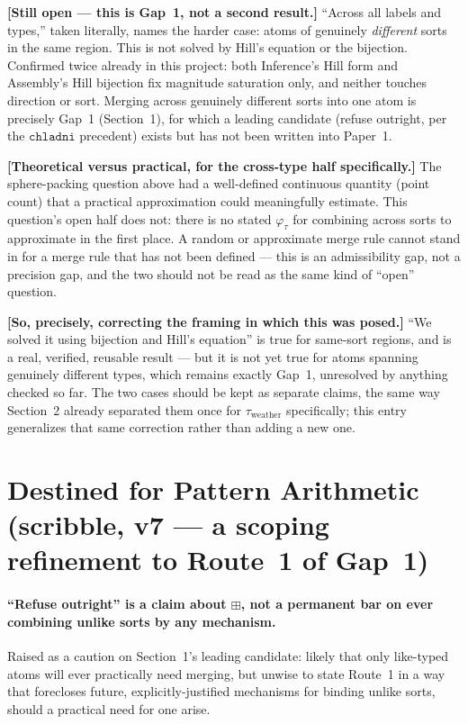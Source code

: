 \documentclass[11pt]{article}
\begin{document}
\textbf{[Still open --- this is Gap~1, not a second result.]} ``Across
all labels and types,'' taken literally, names the harder case: atoms
of genuinely \emph{different} sorts in the same region. This is not
solved by Hill's equation or the bijection. Confirmed twice already
in this project: both Inference's Hill form and Assembly's Hill
bijection fix magnitude saturation only, and neither touches direction
or sort. Merging across genuinely different sorts into one atom is
precisely Gap~1 (Section~1), for which a leading candidate (refuse
outright, per the $\mathtt{chladni}$ precedent) exists but has not
been written into Paper~1.

\textbf{[Theoretical versus practical, for the cross-type half
specifically.]} The sphere-packing question above had a well-defined
continuous quantity (point count) that a practical approximation could
meaningfully estimate. This question's open half does not: there is no
stated $\varphi_\tau$ for combining across sorts to approximate in the
first place. A random or approximate merge rule cannot stand in for a
merge rule that has not been defined --- this is an admissibility gap,
not a precision gap, and the two should not be read as the same kind
of ``open'' question.

\textbf{[So, precisely, correcting the framing in which this was
posed.]} ``We solved it using bijection and Hill's equation'' is true
for same-sort regions, and is a real, verified, reusable result ---
but it is not yet true for atoms spanning genuinely different types,
which remains exactly Gap~1, unresolved by anything checked so far.
The two cases should be kept as separate claims, the same way
Section~2 already separated them once for $\tau_{\text{weather}}$
specifically; this entry generalizes that same correction rather than
adding a new one.

\section{Destined for Pattern Arithmetic (scribble, v7 --- a scoping
refinement to Route~1 of Gap~1)}

\paragraph{``Refuse outright'' is a claim about $\boxplus$, not a
permanent bar on ever combining unlike sorts by any mechanism.}
Raised as a caution on Section~1's leading candidate: likely that only
like-typed atoms will ever practically need merging, but unwise to
state Route~1 in a way that forecloses future, explicitly-justified
mechanisms for binding unlike sorts, should a practical need for one
arise.
\end{document}
